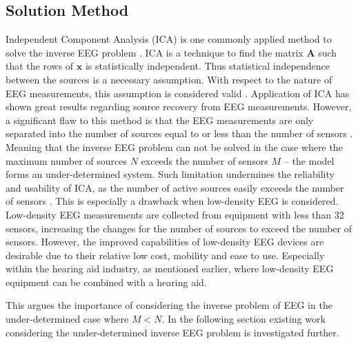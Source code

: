 \subsection{Solution Method}\label{sec:ICAsolution}
Independent Component Analysis (ICA) is one commonly applied method to solve the inverse EEG problem \cite{Scott1996}\cite{Scott1997}. ICA is a technique to find the matrix $\mathbf{A}$ such that the rows of $\mathbf{x}$ is statistically independent. 
Thus statistical independence between the sources is a necessary assumption. With respect to the nature of EEG measurements, this assumption is considered valid \cite[p. 3]{Scott1997}. 
Application of ICA has shown great results regarding source recovery from EEG measurements. 
However, a significant flaw to this method is that the EEG measurements are only separated into the number of sources equal to or less than the number of sensors \cite{Balkan2015}.
Meaning that the inverse EEG problem can not be solved in the case where the maximum number of sources $N$ exceeds the number of sensors $M$ -- the model forms an under-determined system. 
Such limitation undermines the reliability and usability of ICA, as the number of active sources easily exceeds the number of sensors \cite{phd2015}. 
This is especially a drawback when low-density EEG is considered. Low-density EEG measurements are collected from equipment with less than 32 sensors, increasing the changes for the number of sources to exceed the number of sensors. 
However, the improved capabilities of low-density EEG devices are desirable due to their relative low cost, mobility and ease to use. 
Especially within the hearing aid industry, as mentioned earlier, where low-density EEG equipment can be combined with a hearing aid.  

This argues the importance of considering the inverse problem of EEG in the under-determined case where $M < N$. In the following section existing work considering the under-determined inverse EEG problem is investigated further. 

